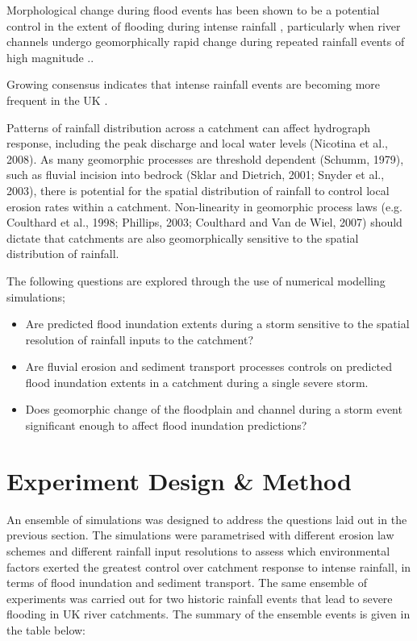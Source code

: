 Morphological change during flood events has been shown to be a potential control in the extent of flooding during intense rainfall \citep{wong2015sensitivity}, particularly when river channels undergo geomorphically rapid change during repeated rainfall events of high magnitude \citep{slater2016extent}.. 

Growing consensus indicates that intense rainfall events are becoming more frequent in the UK \citep{kendon2014heavier}.

Patterns of rainfall distribution across a catchment can affect hydrograph response, including the peak discharge and local water levels (Nicotina et al., 2008). As many geomorphic processes are threshold dependent (Schumm, 1979), such as fluvial incision into bedrock (Sklar and Dietrich, 2001; Snyder et al., 2003), there is potential for the spatial distribution of rainfall to control local erosion rates within a catchment. Non-linearity in geomorphic process laws (e.g. Coulthard et al., 1998; Phillips, 2003; Coulthard and Van de Wiel, 2007) should dictate that catchments are also geomorphically sensitive to the spatial distribution of rainfall. 

The following questions are explored through the use of numerical modelling simulations;

\begin{itemize}
\item Are predicted flood inundation extents during a storm sensitive to the spatial resolution of rainfall inputs to the catchment?
\item Are fluvial erosion and sediment transport processes controls on predicted flood inundation extents in a catchment during a single severe storm.
\item Does geomorphic change of the floodplain and channel during a storm event significant enough to affect flood inundation predictions?
\end{itemize}

\section{Experiment Design \& Method}
An ensemble of simulations was designed to address the questions laid out in the previous section. The simulations were parametrised with different erosion law schemes and different rainfall input resolutions to assess which environmental factors exerted the greatest control over catchment response to intense rainfall, in terms of flood inundation and sediment transport. The same ensemble of experiments was carried out for two historic rainfall events that lead to severe flooding in UK river catchments. The summary of the ensemble events is given in the table below:

